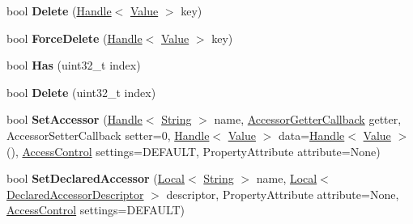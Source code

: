 \begin{DoxyCompactItemize}
\item 
\hypertarget{classv8_1_1_object_a6850815e31ba9fc75d368c69892cfd8b}{}bool {\bfseries Delete} (\hyperlink{classv8_1_1_handle}{Handle}$<$ \hyperlink{classv8_1_1_value}{Value} $>$ key)\label{classv8_1_1_object_a6850815e31ba9fc75d368c69892cfd8b}

\item 
\hypertarget{classv8_1_1_object_a8e7f3b8b70eb17bcb5cc087d5b6746d6}{}bool {\bfseries Force\+Delete} (\hyperlink{classv8_1_1_handle}{Handle}$<$ \hyperlink{classv8_1_1_value}{Value} $>$ key)\label{classv8_1_1_object_a8e7f3b8b70eb17bcb5cc087d5b6746d6}

\item 
\hypertarget{classv8_1_1_object_ac547af2f2d256d96991ff20159a44bfd}{}bool {\bfseries Has} (uint32\+\_\+t index)\label{classv8_1_1_object_ac547af2f2d256d96991ff20159a44bfd}

\item 
\hypertarget{classv8_1_1_object_a63f88a22cb5d994eedc1efc79520bc42}{}bool {\bfseries Delete} (uint32\+\_\+t index)\label{classv8_1_1_object_a63f88a22cb5d994eedc1efc79520bc42}

\item 
\hypertarget{classv8_1_1_object_a7590761426aae338f6ab308ff65d491c}{}bool {\bfseries Set\+Accessor} (\hyperlink{classv8_1_1_handle}{Handle}$<$ \hyperlink{classv8_1_1_string}{String} $>$ name, \hyperlink{namespacev8_a722613c87061708a4f1aa050d095f868}{Accessor\+Getter\+Callback} getter, Accessor\+Setter\+Callback setter=0, \hyperlink{classv8_1_1_handle}{Handle}$<$ \hyperlink{classv8_1_1_value}{Value} $>$ data=\hyperlink{classv8_1_1_handle}{Handle}$<$ \hyperlink{classv8_1_1_value}{Value} $>$(), \hyperlink{namespacev8_a31d8355cb043d7d2dda3f4a52760b64e}{Access\+Control} settings=D\+E\+F\+A\+U\+L\+T, Property\+Attribute attribute=None)\label{classv8_1_1_object_a7590761426aae338f6ab308ff65d491c}

\item 
\hypertarget{classv8_1_1_object_afa3eb22c17e71689260fe2b1079705ef}{}bool {\bfseries Set\+Declared\+Accessor} (\hyperlink{classv8_1_1_local}{Local}$<$ \hyperlink{classv8_1_1_string}{String} $>$ name, \hyperlink{classv8_1_1_local}{Local}$<$ \hyperlink{classv8_1_1_declared_accessor_descriptor}{Declared\+Accessor\+Descriptor} $>$ descriptor, Property\+Attribute attribute=None, \hyperlink{namespacev8_a31d8355cb043d7d2dda3f4a52760b64e}{Access\+Control} settings=D\+E\+F\+A\+U\+L\+T)\label{classv8_1_1_object_afa3eb22c17e71689260fe2b1079705ef}


\end{DoxyCompactItemize}
